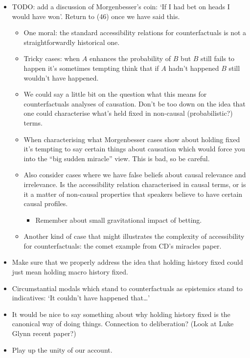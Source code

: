 \documentclass[If.tex]{subfiles}
\begin{document}
\begin{itemize}
	\item
	TODO: add a discussion of Morgenbesser's coin: ‘If I had bet on heads I would have won’. Return to (46) once we have said this.
	\begin{itemize} 
		\item
		One moral: the standard accessibility relations for counterfactuals is not a straightforwardly historical one.
		\item
		Tricky cases: when $A$ enhances the probability of $B$ but $B$ still fails to happen it's sometimes tempting think that if $A$ hadn't happened $B$ still wouldn't have happened.
		\item
		We could say a little bit on the question what this means for counterfactuals analyses of causation. Don't be too down on the idea that one could characterise what's held fixed in non-causal (probabilistic?) terms.
		\item
		When characterising what Morgenbesser cases show about holding fixed it's tempting to say certain things about causation which would force you into the “big sudden miracle” view. This is bad, so be careful.
		\item
		Also consider cases where we have false beliefs about causal relevance and irrelevance. Is the accessibility relation characterised in causal terms, or is it a matter of non-causal properties that speakers believe to have certain causal profiles.
		\begin{itemize} 
			\item
			Remember about small gravitational impact of betting.
		\end{itemize}
		\item
		Another kind of case that might illustrates the complexity of accessibility for counterfactuals: the comet example from CD's miracles paper. 
	\end{itemize}
	\item
	Make sure that we properly address the idea that holding history fixed could just mean holding macro history fixed.
	\item
	Circumstantial modals which stand to counterfactuals as epistemics stand to indicatives: ‘It couldn't have happened that\ldots{}’
	\item
	It would be nice to say something about why holding history fixed is the canonical way of doing things. Connection to deliberation? (Look at Luke Glynn recent paper?)
	\item
	Play up the unity of our account.

\end{itemize}
\end{document}
